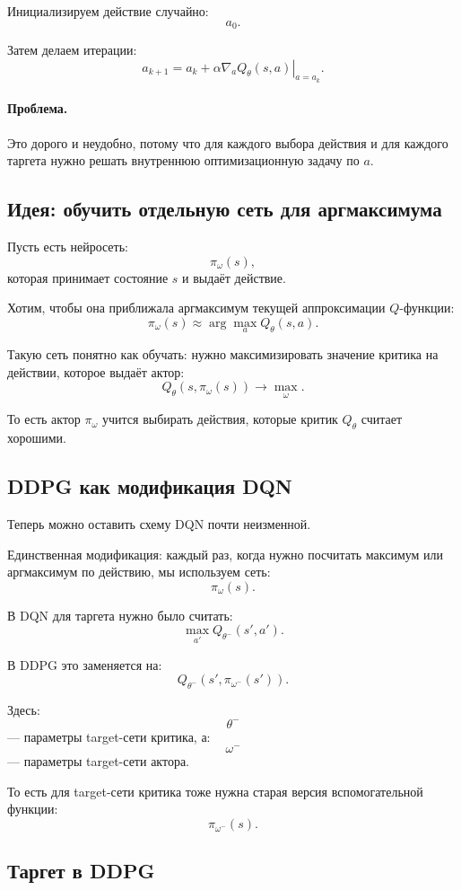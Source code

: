 \documentclass[12pt,a4paper]{article}
\begin{document}
Инициализируем действие случайно:
\[
a_0.
\]

Затем делаем итерации:
\[
a_{k+1}
=
a_k
+
\alpha
\left.
\nabla_a Q_\theta(s,a)
\right|_{a=a_k}.
\]

\paragraph{Проблема.}

Это дорого и неудобно, потому что для каждого выбора действия и для каждого таргета нужно решать внутреннюю оптимизационную задачу по $a$.

\subsection{Идея: обучить отдельную сеть для аргмаксимума}

Пусть есть нейросеть:
\[
\pi_\omega(s),
\]
которая принимает состояние $s$ и выдаёт действие.

Хотим, чтобы она приближала аргмаксимум текущей аппроксимации $Q$-функции:
\[
\pi_\omega(s)
\approx
\arg\max_a Q_\theta(s,a).
\]

Такую сеть понятно как обучать: нужно максимизировать значение критика на действии, которое выдаёт актор:
\[
Q_\theta(s,\pi_\omega(s))
\to
\max_\omega.
\]

То есть актор $\pi_\omega$ учится выбирать действия, которые критик $Q_\theta$ считает хорошими.

\subsection{DDPG как модификация DQN}

Теперь можно оставить схему DQN почти неизменной.

Единственная модификация: каждый раз, когда нужно посчитать максимум или аргмаксимум по действию, мы используем сеть:
\[
\pi_\omega(s).
\]

В DQN для таргета нужно было считать:
\[
\max_{a'} Q_{\theta^-}(s',a').
\]

В DDPG это заменяется на:
\[
Q_{\theta^-}(s',\pi_{\omega^-}(s')).
\]

Здесь:
\[
\theta^-
\]
--- параметры target-сети критика, а:
\[
\omega^-
\]
--- параметры target-сети актора.

То есть для target-сети критика тоже нужна старая версия вспомогательной функции:
\[
\pi_{\omega^-}(s).
\]

\subsection{Таргет в DDPG}
\end{document}

